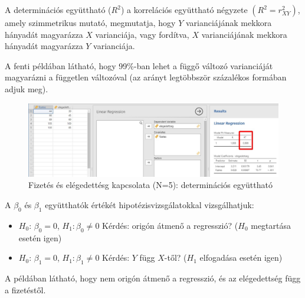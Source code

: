 \documentclass[
  letterpaper,
]{krantz}
\makeatletter
\newenvironment{Shaded}{\begin{snugshade}}{\end{snugshade}}
\newcommand{\CommentTok}[1]{\textcolor[rgb]{0.37,0.37,0.37}{#1}}
\newcommand{\FunctionTok}[1]{\textcolor[rgb]{0.28,0.35,0.67}{#1}}
\newcommand{\NormalTok}[1]{\textcolor[rgb]{0.00,0.23,0.31}{#1}}
\newcommand{\SpecialCharTok}[1]{\textcolor[rgb]{0.37,0.37,0.37}{#1}}
\providecommand{\tightlist}{%
  \setlength{\itemsep}{0pt}\setlength{\parskip}{0pt}}\usepackage{longtable,booktabs,array}
\newenvironment{kframe}{%
\medskip{}
\setlength{\fboxsep}{.8em}
 \def\at@end@of@kframe{}%
 \ifinner\ifhmode%
  \def\at@end@of@kframe{\end{minipage}}%
  \begin{minipage}{\columnwidth}%
 \fi\fi%
 \def\FrameCommand##1{\hskip\@totalleftmargin \hskip-\fboxsep
 \colorbox{shadecolor}{##1}\hskip-\fboxsep
     \hskip-\linewidth \hskip-\@totalleftmargin \hskip\columnwidth}%
 \MakeFramed {\advance\hsize-\width
   \@totalleftmargin\z@ \linewidth\hsize
   \@setminipage}}%
 {\par\unskip\endMakeFramed%
 \at@end@of@kframe}
\renewenvironment{Shaded}{\begin{kframe}}{\end{kframe}}
\makeatother
\begin{document}
A determinációs együttható (\(R^2\)) a korrelációs együttható négyzete
\((R^2=r_{XY}^2)\), amely szimmetrikus mutató, megmutatja, hogy \(Y\)
varianciájának mekkora hányadát magyarázza \(X\) varianciája, vagy
fordítva, \(X\) varianciájának mekkora hányadát magyarázza \(Y\)
varianciája.

A fenti példában látható, hogy 99\%-ban lehet a függő változó
varianciáját magyarázni a független változóval (az arányt legtöbbször
százalékos formában adjuk meg).

\begin{Shaded}
\end{Shaded}

\begin{figure}

{\centering \includegraphics{./images/lin_reg_fizetes_elegedettseg_02_kep_02.jpg}

}

\caption{Fizetés és elégedettésg kapcsolata (N=5): determinációs
együttható}

\end{figure}

A \(\beta_0\) és \(\beta_1\) együtthatók értékét hipotézisvizsgálatokkal
vizsgálhatjuk:

\begin{itemize}
\tightlist
\item
  \(H_0\): \(\beta_0=0\), \(H_1: \beta_0 \neq 0\) Kérdés: origón átmenő
  a regresszió? (\(H_0\) megtartása esetén igen)
\item
  \(H_0\): \(\beta_1=0\), \(H_1: \beta_1 \neq 0\) Kérdés: \(Y\) függ
  \(X\)-től? (\(H_1\) elfogadása esetén igen)
\end{itemize}

A példában látható, hogy nem origón átmenő a regresszió, és az
elégedettség függ a fizetéstől.

\begin{Shaded}
\end{Shaded}
\end{document}
